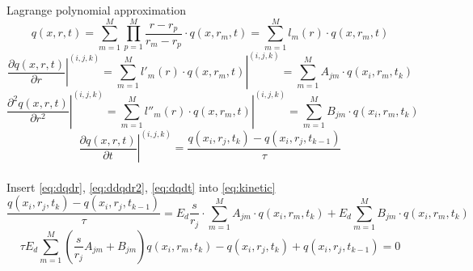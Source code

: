 \documentclass[12pt]{article}
\begin{document}
Lagrange polynomial approximation
\begin{equation}
q(x,r,t)=
\sum_{m=1}^M\prod_{p=1}^M \dfrac{r-r_p}{r_m-r_p}\cdot  q(x,r_m,t)=
\sum_{m=1}^Ml_m(r)\cdot  q(x,r_m,t)
\end{equation}
\begin{equation}\label{eq:dqdr}
\left.\dfrac{\partial q(x,r,t)}{\partial r}\right\vert^{(i, j, k)}=
\left.\sum_{m=1}^Ml'_m(r)\cdot  q(x,r_m,t)\right\vert^{(i, j, k)}=
\sum_{m=1}^MA_{jm}\cdot  q(x_i,r_m,t_k)
\end{equation}
\begin{equation}\label{eq:ddqdr2}
\left.\dfrac{\partial^2 q(x,r,t)}{\partial r^2}\right\vert^{(i, j, k)}=
\left.\sum_{m=1}^Ml''_m(r)\cdot  q(x,r_m,t)\right\vert^{(i, j, k)}=
\sum_{m=1}^MB_{jm}\cdot  q(x_i,r_m,t_k)
\end{equation}
\begin{equation}\label{eq:dqdt}
\left.\dfrac{\partial q(x,r,t)}{\partial t}\right\vert^{(i, j, k)}=
\dfrac{q(x_i,r_j,t_{k}) - q(x_i,r_j,t_{k-1})}{\tau}
\end{equation}\\

Insert  \eqref{eq:dqdr}, \eqref{eq:ddqdr2}, \eqref{eq:dqdt} into \eqref{eq:kinetic} 
\begin{equation}
\dfrac{q(x_i,r_j,t_{k}) - q(x_i,r_j,t_{k-1})}{\tau}=
E_d\dfrac{s}{r_j}\cdot \sum_{m=1}^MA_{jm} \cdot q(x_i,r_m,t_{k}) + E_d\sum_{m=1}^MB_{jm}\cdot  q(x_i,r_m,t_{k})
\end{equation}
\begin{equation} \label{eq:almostMain}
\tau E_d\sum_{m=1}^M \left(\dfrac{s}{r_j} A_{jm} + B_{jm} \right) q(x_i,r_m,t_{k}) - q(x_i,r_j,t_{k}) + q(x_i,r_j,t_{k-1}) = 0
\end{equation}
\end{document}
